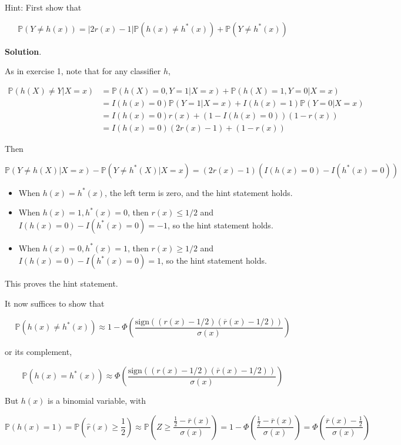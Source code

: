 Hint: First show that

\[ \mathbb{P}(Y \neq h(x)) = |2 r(x) - 1| \mathbb{P}(h(x) \neq h^*(x)) + \mathbb{P}(Y \neq h^*(x))\]

\textbf{Solution}.

As in exercise 1, note that for any classifier \(h\),

\[ 
\begin{align}
\mathbb{P}(h(X) \neq Y | X = x) &= \mathbb{P}(h(X) = 0, Y = 1 | X = x) + \mathbb{P}(h(X) = 1, Y = 0 | X = x) \\
&= I(h(x) = 0) \mathbb{P}(Y = 1 | X = x) + I(h(x) = 1) \mathbb{P}(Y = 0 | X = x) \\
&= I(h(x) = 0) r(x) + (1 - I(h(x) = 0)) (1 - r(x)) \\
&= I(h(x) = 0) (2 r(x) - 1) + (1 - r(x))
\end{align}
\]

Then

\[
\mathbb{P}(Y \neq h(X) | X = x) - \mathbb{P}(Y \neq h^*(X) | X = x) = (2 r(x) - 1) \left(I(h(x) = 0) - I(h^*(x) = 0)\right)
\]

\begin{itemize}[tightlist]
\item
  When \(h(x) = h^*(x)\), the left term is zero, and the hint statement
  holds.
\item
  When \(h(x) = 1, h^*(x) = 0\), then \(r(x) \leq 1/2\) and
  \(I(h(x) = 0) - I(h^*(x) = 0) = -1\), so the hint statement holds.
\item
  When \(h(x) = 0, h^*(x) = 1\), then \(r(x) \geq 1/2\) and
  \(I(h(x) = 0) - I(h^*(x) = 0) = 1\), so the hint statement holds.
\end{itemize}

This proves the hint statement.

It now suffices to show that

\[ \mathbb{P}(h(x) \neq h^*(x)) \approx 1 - \Phi \left( \frac{\text{sign} \left( (r(x) - 1/2) (\overline{r}(x) - 1/2) \right)}{\sigma(x)} \right) \]

or its complement,

\[ \mathbb{P}(h(x) = h^*(x)) \approx \Phi \left( \frac{\text{sign} \left( (r(x) - 1/2) (\overline{r}(x) - 1/2) \right)}{\sigma(x)} \right) \]

But \(h(x)\) is a binomial variable, with

\[ \mathbb{P}(h(x) = 1) = \mathbb{P}\left(\hat{r}(x) \geq \frac{1}{2} \right) \approx \mathbb{P}\left( Z \geq \frac{\frac{1}{2} - \overline{r}(x)}{\sigma(x)} \right) = 1 - \Phi\left( \frac{\frac{1}{2} - \overline{r}(x)}{\sigma(x)} \right) = \Phi\left( \frac{\overline{r}(x) - \frac{1}{2}}{\sigma(x)} \right)\]

